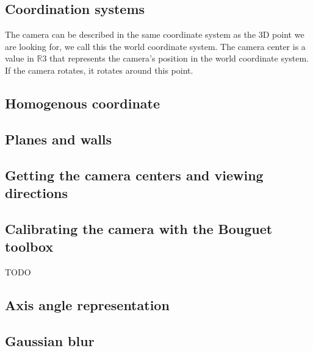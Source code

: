 \subsection{Coordination systems}
The camera can be described in the same coordinate system as the 3D point we are
looking for, we call this the world coordinate system. 
The camera center is a value in $\mathbb{R}$3 that represents the camera's position in the world
coordinate system. If the camera rotates, it rotates around this point.

\subsection{Homogenous coordinate}


\subsection{Planes and walls}
\label{sec:planeswalls}

\subsection{Getting the camera centers and viewing directions}
\label{sec:cameracenters}

\subsection{Calibrating the camera with the Bouguet toolbox}
\label{sec:bouguet}
TODO

\subsection{Axis angle representation}
\label{sec:axisAngle}

\subsection{Gaussian blur}

